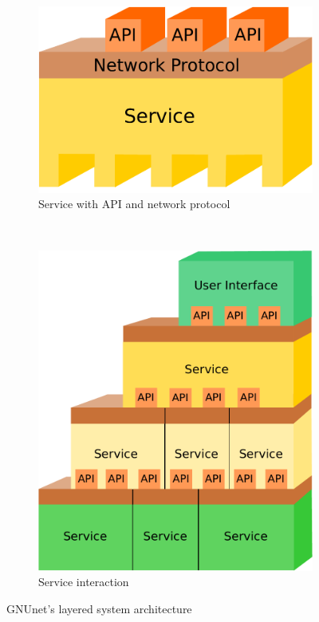 \documentclass[10pt]{article}
\begin{document}
\begin{figure}[!h]
  \begin{center}
        \begin{subfigure}[b]{0.3\textwidth}
                \centering
                \includegraphics[width=\textwidth]{figs/Service.pdf}
                \caption{Service with API and network protocol}
                \label{fig:service}
        \end{subfigure}
        ~~~~~~~~~~
        \begin{subfigure}[b]{0.3\textwidth}
                \centering
                \includegraphics[width=\textwidth]{figs/System.pdf}
                \caption{Service interaction}
                \label{fig:interaction}
        \end{subfigure}
  \end{center}
  \caption{GNUnet's layered system architecture}
\end{figure}
\end{document}
